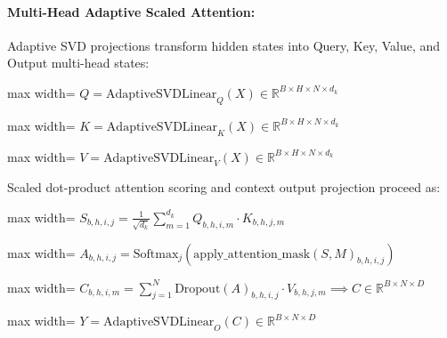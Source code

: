 \paragraph{Multi-Head Adaptive Scaled Attention:}
Adaptive SVD projections transform hidden states into Query, Key, Value, and Output multi-head states:

\begin{center}
\begin{adjustbox}{max width=\columnwidth}
$\displaystyle
Q = \text{AdaptiveSVDLinear}_Q(X) \in \mathbb{R}^{B \times H \times N \times d_k}
$
\end{adjustbox}
\end{center}
\begin{center}
\begin{adjustbox}{max width=\columnwidth}
$\displaystyle
K = \text{AdaptiveSVDLinear}_K(X) \in \mathbb{R}^{B \times H \times N \times d_k}
$
\end{adjustbox}
\end{center}
\begin{center}
\begin{adjustbox}{max width=\columnwidth}
$\displaystyle
V = \text{AdaptiveSVDLinear}_V(X) \in \mathbb{R}^{B \times H \times N \times d_k}
$
\end{adjustbox}
\end{center}

Scaled dot-product attention scoring and context output projection proceed as:

\begin{center}
\begin{adjustbox}{max width=\columnwidth}
$\displaystyle
S_{b, h, i, j} = \frac{1}{\sqrt{d_k}} \sum_{m=1}^{d_k} Q_{b, h, i, m} \cdot K_{b, h, j, m}
$
\end{adjustbox}
\end{center}
\begin{center}
\begin{adjustbox}{max width=\columnwidth}
$\displaystyle
A_{b, h, i, j} = \text{Softmax}_j (\text{apply\_attention\_mask}(S, M)_{b, h, i, j})
$
\end{adjustbox}
\end{center}
\begin{center}
\begin{adjustbox}{max width=\columnwidth}
$\displaystyle
C_{b, h, i, m} = \sum_{j=1}^N \text{Dropout}(A)_{b, h, i, j} \cdot V_{b, h, j, m} \implies C \in \mathbb{R}^{B \times N \times D}
$
\end{adjustbox}
\end{center}
\begin{center}
\begin{adjustbox}{max width=\columnwidth}
$\displaystyle
Y = \text{AdaptiveSVDLinear}_O(C) \in \mathbb{R}^{B \times N \times D}
$
\end{adjustbox}
\end{center}


